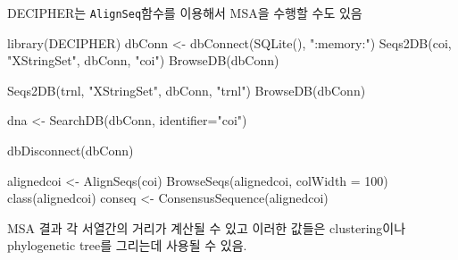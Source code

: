 \documentclass[
]{book}
\newenvironment{Shaded}{\begin{snugshade}}{\end{snugshade}}
\newcommand{\AttributeTok}[1]{\textcolor[rgb]{0.77,0.63,0.00}{#1}}
\newcommand{\DecValTok}[1]{\textcolor[rgb]{0.00,0.00,0.81}{#1}}
\newcommand{\FunctionTok}[1]{\textcolor[rgb]{0.00,0.00,0.00}{#1}}
\newcommand{\NormalTok}[1]{#1}
\newcommand{\OtherTok}[1]{\textcolor[rgb]{0.56,0.35,0.01}{#1}}
\newcommand{\StringTok}[1]{\textcolor[rgb]{0.31,0.60,0.02}{#1}}
\begin{document}
DECIPHER는 \texttt{AlignSeq}함수를 이용해서 MSA을 수행할 수도 있음

\begin{Shaded}
\begin{Highlighting}[]
\FunctionTok{library}\NormalTok{(DECIPHER)}
\NormalTok{dbConn }\OtherTok{\textless{}{-}} \FunctionTok{dbConnect}\NormalTok{(}\FunctionTok{SQLite}\NormalTok{(), }\StringTok{":memory:"}\NormalTok{)}
\FunctionTok{Seqs2DB}\NormalTok{(coi, }\StringTok{"XStringSet"}\NormalTok{, dbConn, }\StringTok{"coi"}\NormalTok{)}
\FunctionTok{BrowseDB}\NormalTok{(dbConn)}

\FunctionTok{Seqs2DB}\NormalTok{(trnl, }\StringTok{"XStringSet"}\NormalTok{, dbConn, }\StringTok{"trnl"}\NormalTok{)}
\FunctionTok{BrowseDB}\NormalTok{(dbConn)}

\NormalTok{dna }\OtherTok{\textless{}{-}} \FunctionTok{SearchDB}\NormalTok{(dbConn, }\AttributeTok{identifier=}\StringTok{"coi"}\NormalTok{)}

\FunctionTok{dbDisconnect}\NormalTok{(dbConn)}


\NormalTok{alignedcoi }\OtherTok{\textless{}{-}} \FunctionTok{AlignSeqs}\NormalTok{(coi)}
\FunctionTok{BrowseSeqs}\NormalTok{(alignedcoi, }\AttributeTok{colWidth =} \DecValTok{100}\NormalTok{)}
\FunctionTok{class}\NormalTok{(alignedcoi)}
\NormalTok{conseq }\OtherTok{\textless{}{-}} \FunctionTok{ConsensusSequence}\NormalTok{(alignedcoi)}
\end{Highlighting}
\end{Shaded}

MSA 결과 각 서열간의 거리가 계산될 수 있고 이러한 값들은 clustering이나 phylogenetic tree를 그리는데 사용될 수 있음.
\end{document}
